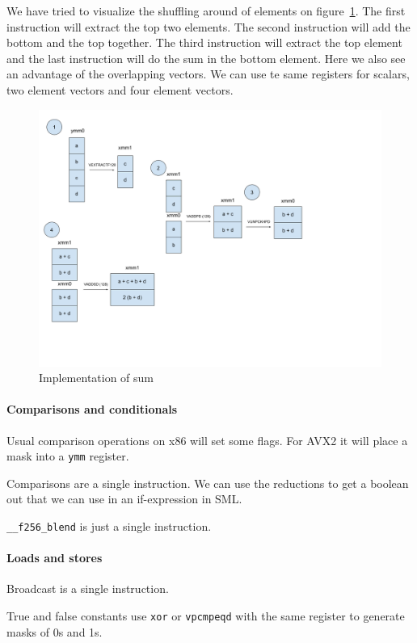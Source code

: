 \documentclass{article}
\begin{document}
We have tried to visualize the shuffling around of elements on figure~\ref{fig:hadd}. The first instruction will extract the top two elements. The second instruction will add the bottom and the top together. The third instruction will extract the top element and the last instruction will do the sum in the bottom element. Here we also see an advantage of the overlapping vectors. We can use te same registers for scalars, two element vectors and four element vectors.

\begin{figure}
    \caption{Implementation of sum}
    \label{fig:hadd}
    \includegraphics[width=\textwidth]{sum.png}
\end{figure}

\paragraph{Comparisons and conditionals}
Usual comparison operations on x86 will set some flags. For AVX2 it will place a mask into a \verb!ymm! register.

Comparisons are a single instruction. We can use the reductions to get a boolean out that we can use in an if-expression in SML.

\verb!__f256_blend! is just a single instruction.
\paragraph{Loads and stores}

Broadcast is a single instruction.

True and false constants use \verb!xor! or \verb!vpcmpeqd! with the same register to generate masks of 0s and 1s.
\end{document}
